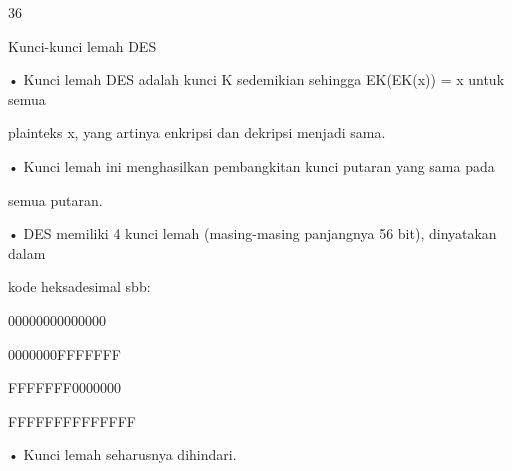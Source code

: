 \documentclass{article}
\begin{document}

36

Kunci-kunci lemah DES

• Kunci lemah DES adalah kunci K sedemikian sehingga EK(EK(x)) = x untuk semua 

plainteks x, yang artinya enkripsi dan dekripsi menjadi sama.

• Kunci lemah ini menghasilkan pembangkitan kunci putaran yang sama  pada 

semua putaran.

• DES memiliki 4 kunci lemah (masing-masing panjangnya 56 bit), dinyatakan dalam 

kode heksadesimal sbb:


00000000000000 


0000000FFFFFFF 


FFFFFFF0000000 


FFFFFFFFFFFFFF 

• Kunci lemah seharusnya dihindari.
\end{document}
